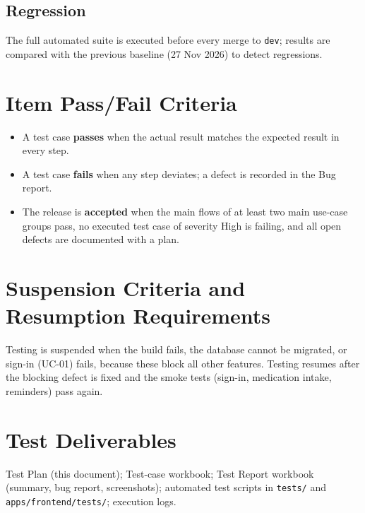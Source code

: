 \documentclass[10pt,letterpaper]{article}
\begin{document}
\subsection{Regression}
The full automated suite is executed before every merge to \texttt{dev}; results are compared with the
previous baseline (27 Nov 2026) to detect regressions.

\section{Item Pass/Fail Criteria}
\begin{itemize}
  \item A test case \textbf{passes} when the actual result matches the expected result in every step.
  \item A test case \textbf{fails} when any step deviates; a defect is recorded in the Bug report.
  \item The release is \textbf{accepted} when the main flows of at least two main use-case groups pass,
        no executed test case of severity High is failing, and all open defects are documented with a plan.
\end{itemize}

\section{Suspension Criteria and Resumption Requirements}
Testing is suspended when the build fails, the database cannot be migrated, or sign-in (UC-01) fails,
because these block all other features. Testing resumes after the blocking defect is fixed and the
smoke tests (sign-in, medication intake, reminders) pass again.

\section{Test Deliverables}
Test Plan (this document); Test-case workbook; Test Report workbook (summary, bug report, screenshots);
automated test scripts in \texttt{tests/} and \texttt{apps/frontend/tests/}; execution logs.

\end{document}
